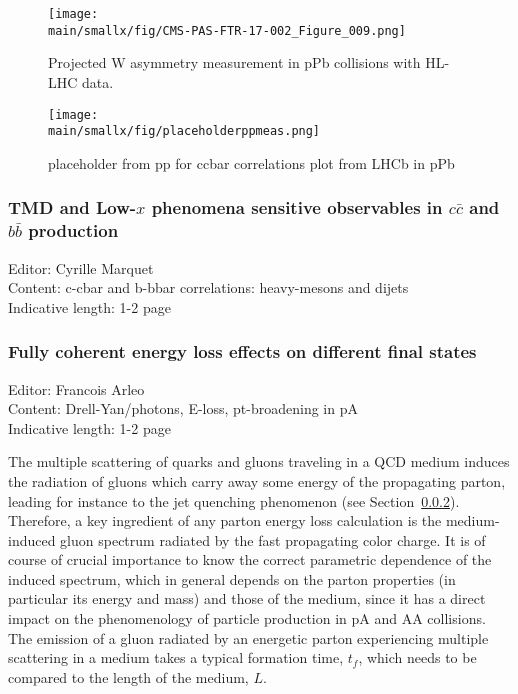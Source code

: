 \documentclass[../report.tex]{subfiles}
\providecommand{\main}{..}
\begin{document}
\begin{figure}[t] %
\centering{} 
\texttt{[image: \\main/smallx/fig/CMS-PAS-FTR-17-002\_Figure\_009.png]}
\caption{
Projected W asymmetry measurement in pPb collisions with HL-LHC data.
\label{fig:Wasym-eta-projection-cms}
}
\end{figure}

\begin{figure}
\texttt{[image: \\main/smallx/fig/placeholderppmeas.png]}
\caption{placeholder from pp for ccbar correlations plot from LHCb in pPb}
\end{figure}

\subsubsection{TMD and Low-$x$ phenomena sensitive observables in $c\bar{c}$ and $b\bar{b}$ production }
Editor:  Cyrille Marquet\\
Content: c-cbar and b-bbar correlations: heavy-mesons and dijets \\
Indicative length: 1-2 page
\subsubsection{Fully coherent energy loss effects on different final states}
Editor: Francois Arleo\\
Content: Drell-Yan/photons, E-loss, pt-broadening in pA\\
Indicative length: 1-2 page

The multiple scattering of quarks and gluons traveling in a QCD medium induces the radiation of gluons which carry away some energy of the propagating parton, leading for instance to the jet quenching phenomenon (see Section~\ref{}). Therefore, a key ingredient of any parton energy loss calculation is  the medium-induced gluon spectrum radiated by the fast propagating color charge. It is of course of crucial importance to know the correct parametric dependence of the induced spectrum, which in general depends on the parton properties (in particular its energy and mass) and those of the medium, since it has a direct impact on the phenomenology of particle production in pA and AA collisions. The emission of a gluon radiated by an energetic parton experiencing multiple scattering in a medium takes a typical formation time, $t_f$, which needs to be compared to the length of the medium, $L$.
\end{document}
